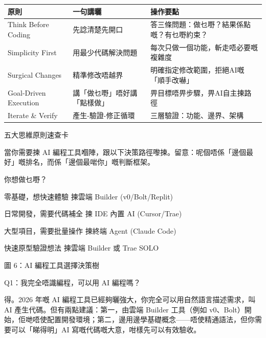 


\begin{center}
\begin{tabularx}{\linewidth}{|X|X|X|}
\hline
\textbf{原則} & \textbf{一句講曬} & \textbf{操作要點} \tabularnewline
\hline
Think Before Coding & 先諗清楚先開口 & 答三條問題：做乜嘢？結果係點嘅？有乜嘢約束？ \tabularnewline
Simplicity First & 用最少代碼解決問題 & 每次只做一個功能，斬走唔必要嘅複雜度 \tabularnewline
Surgical Changes & 精準修改唔越界 & 明確指定修改範圍，拒絕AI嘅「順手改嚇」 \tabularnewline
Goal-Driven Execution & 講「做乜嘢」唔好講「點樣做」 & 畀目標唔畀步驟，畀AI自主揀路徑 \tabularnewline
Iterate \& Verify & 產生-驗證-修正循環 & 三層驗證：功能、邊界、架構 \tabularnewline
\hline
\end{tabularx}
\end{center}

\begin{center}\small\color{gray}五大思維原則速查卡\end{center}


當你需要揀 AI 編程工具嗰陣，跟以下決策路徑嚟揀。留意：呢個唔係「邊個最好」嘅排名，而係「邊個最啱你」嘅判斷框架。

你想做乜嘢？

零基礎，想快速體驗 揀雲端 Builder (v0/Bolt/Replit)

日常開發，需要代碼補全 揀 IDE 內置 AI (Cursor/Trae)

大型項目，需要批量操作 揀終端 Agent (Claude Code)

快速原型驗證想法 揀雲端 Builder 或 Trae SOLO

\begin{center}\small\color{gray}圖 6：AI 編程工具選擇決策樹\end{center}


Q1：我完全唔識編程，可以用 AI 編程嗎？

得。2026 年嘅 AI 編程工具已經夠曬強大，你完全可以用自然語言描述需求，叫 AI 產生代碼。但有兩點建議：第一，由雲端 Builder 工具（例如 v0、Bolt）開始，佢哋唔使配置開發環境；第二，邊用邊學基礎概念——唔使精通語法，但你需要可以「睇得明」AI 寫嘅代碼嘅大意，咁樣先可以有效驗收。

